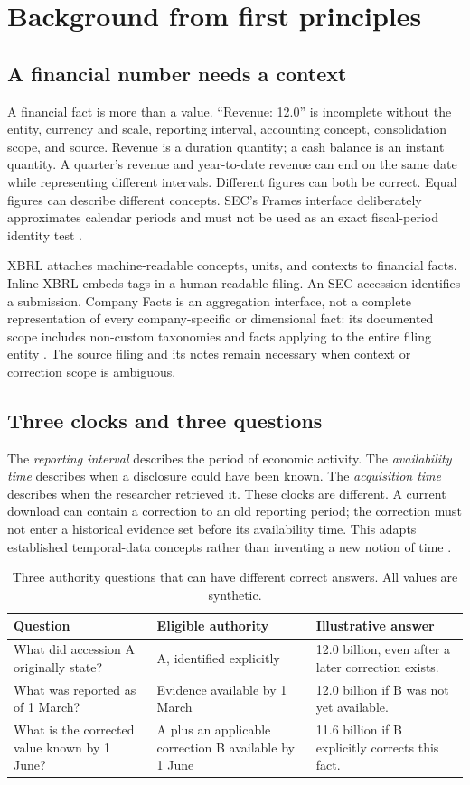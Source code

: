 \documentclass[11pt,a4paper]{article}
\newcommand{\pbreak}{\clearpage}
\begin{document}
\pbreak
\section{Background from first principles}
\subsection{A financial number needs a context}
A financial fact is more than a value. “Revenue: 12.0” is incomplete without the entity, currency and scale, reporting interval, accounting concept, consolidation scope, and source. Revenue is a duration quantity; a cash balance is an instant quantity. A quarter's revenue and year-to-date revenue can end on the same date while representing different intervals. Different figures can both be correct. Equal figures can describe different concepts. SEC's Frames interface deliberately approximates calendar periods and must not be used as an exact fiscal-period identity test \cite{sec}.

XBRL attaches machine-readable concepts, units, and contexts to financial facts. Inline XBRL embeds tags in a human-readable filing. An SEC accession identifies a submission. Company Facts is an aggregation interface, not a complete representation of every company-specific or dimensional fact: its documented scope includes non-custom taxonomies and facts applying to the entire filing entity \cite{sec}. The source filing and its notes remain necessary when context or correction scope is ambiguous.

\subsection{Three clocks and three questions}
The \emph{reporting interval} describes the period of economic activity. The \emph{availability time} describes when a disclosure could have been known. The \emph{acquisition time} describes when the researcher retrieved it. These clocks are different. A current download can contain a correction to an old reporting period; the correction must not enter a historical evidence set before its availability time. This adapts established temporal-data concepts rather than inventing a new notion of time \cite{jensen}.

\begin{table}[H]\centering\small
\caption{Three authority questions that can have different correct answers. All values are synthetic.}
\begin{tabularx}{\linewidth}{p{34mm}YY}\toprule
Question & Eligible authority & Illustrative answer\\\midrule
What did accession A originally state? & A, identified explicitly & 12.0 billion, even after a later correction exists.\\
What was reported as of 1 March? & Evidence available by 1 March & 12.0 billion if B was not yet available.\\
What is the corrected value known by 1 June? & A plus an applicable correction B available by 1 June & 11.6 billion if B explicitly corrects this fact.\\\bottomrule
\end{tabularx}\end{table}
\end{document}
